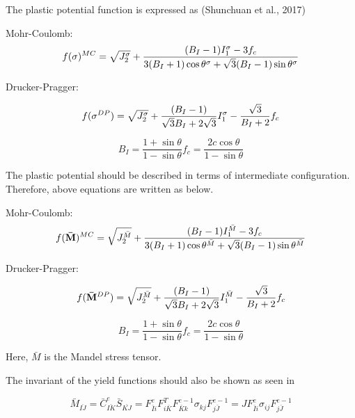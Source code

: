 The plastic potential function is expressed as
(Shunchuan et al., 2017)


Mohr-Coulomb:
\begin{equation}
    f({\bf \sigma} )^{MC} = \sqrt{J_2^{\sigma} } + \frac{ (B_I-1)I_1^{\sigma} - 3f_c  }{  3(B_I+1)\cos{\theta^{\sigma}} + \sqrt{3}(B_I-1)\sin{\theta^{\sigma}}  }
    \label{Mohr_Coulomb_current}
\end{equation}

Drucker-Pragger:

\begin{equation}
    f({\bf \sigma}^{DP} ) = \sqrt{J_2^{\sigma} }  + \frac{(B_I-1)}{\sqrt{3}B_I+2\sqrt{3} }I_1^{\sigma} - \frac{\sqrt{3} }{B_I +2 }f_c
\end{equation}

\begin{equation}
    B_I = \frac{1+\sin{\theta}}{1-\sin{\theta}}
    f_c = \frac{2c\cos{\theta}}{1-\sin{\theta}}
\end{equation}

The plastic potential should be described in terms of intermediate configuration. Therefore, above equations are written as below.


Mohr-Coulomb:
\begin{equation}
    f({\bf  \bar{M} } )^{MC} = \sqrt{J_2^{ \bar{M} } } + \frac{ (B_I-1)I_1^{ \bar{M} } - 3f_c  }{  3(B_I+1)\cos{\theta^{ \bar{M} }} + \sqrt{3}(B_I-1)\sin{\theta^{ \bar{M} }}  }
    \label{Mohr_Coulomb_current}
\end{equation}

Drucker-Pragger:

\begin{equation}
    f({\bf  \bar{M} }^{DP} ) = \sqrt{J_2^{ \bar{M} } }  + \frac{(B_I-1)}{\sqrt{3}B_I+2\sqrt{3} }I_1^{ \bar{M} } - \frac{\sqrt{3} }{B_I +2 }f_c
\end{equation}

\begin{equation}
    B_I = \frac{1+\sin{\theta}}{1-\sin{\theta}}
    f_c = \frac{2c\cos{\theta}}{1-\sin{\theta}}
\end{equation}

Here, $\bar{M}$ is the Mandel stress tensor.

The invariant of the yield functions should also be shown as seen in

\begin{equation}
    \bar{M}_{\bar{IJ}} = \bar{C}_{\bar{IK}}^e \bar{S}_{\bar{KJ}} = F_{\bar{I}i}^{e}  F_{i \bar{K}}^{T} F_{ \bar{K}k}^{e-1} \sigma_{kj} F_{j\bar{J}}^{e-1}  = J F_{\bar{I}i}^{e} \sigma_{ij} F_{j\bar{J}}^{e-1}
\end{equation}

